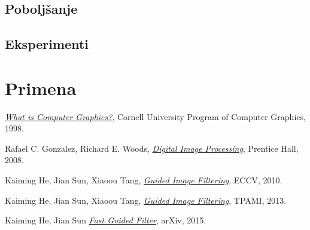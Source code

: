 \documentclass[a4paper,12pt,titlepage]{article}
\begin{document}
\subsection{Poboljšanje}%

\subsection{Eksperimenti}%

 

\section{Primena}%

\newpage
{}
\begin{thebibliography}{10}

\emph{\href{http://www.graphics.cornell.edu/online/tutorial/}{What is Computer Graphics?}},
Cornell University Program of Computer Graphics,
1998.

Rafael C. Gonzalez, Richard E. Woods,
\emph{\href{https://books.google.rs/books?id=8uGOnjRGEzoC&redir_esc=y}{Digital Image Processing}},
Prentice Hall,
2008.

Kaiming He, Jian Sun, Xiaoou Tang,
\emph{\href{http://kaiminghe.com/publications/eccv10guidedfilter.pdf}{Guided Image Filtering}},
ECCV,
2010.

Kaiming He, Jian Sun, Xiaoou Tang,
\emph{\href{http://kaiminghe.com/publications/pami12guidedfilter.pdf}{Guided Image Filtering}},
TPAMI,
2013.

Kaiming He, Jian Sun
\emph{\href{https://arxiv.org/pdf/1505.00996.pdf}{Fast Guided Filter}},
arXiv,
2015.

\end{thebibliography}
\end{document}
